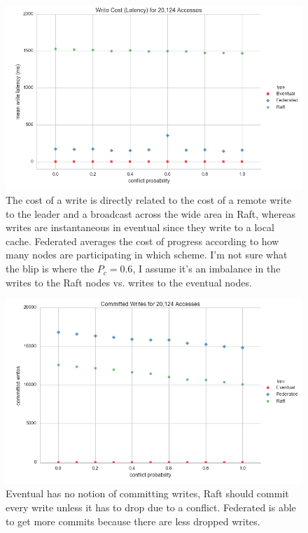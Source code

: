 \documentclass[11pt,letterpaper]{article}
\begin{document}
\begin{figure}[!h]
    \centering
        \includegraphics[width=\textwidth]{figures/write_latency.png}
        \caption{\textsf{The cost of a write is directly related to the cost of a remote write to the leader and a broadcast across the wide area in Raft, whereas writes are instantaneous in eventual since they write to a local cache. Federated averages the cost of progress according to how many nodes are participating in which scheme. I'm not sure what the blip is where the $P_c=0.6$, I assume it's an imbalance in the writes to the Raft nodes vs. writes to the eventual nodes.}}
        \label{fig:write_latency}
\end{figure}


\begin{figure}[!h]
    \centering
        \includegraphics[width=\textwidth]{figures/committed_writes.png}
        \caption{\textsf{Eventual has no notion of committing writes, Raft should commit every write unless it has to drop due to a conflict. Federated is able to get more commits because there are less dropped writes.}}
        \label{fig:committed_writes}
\end{figure}
\end{document}
